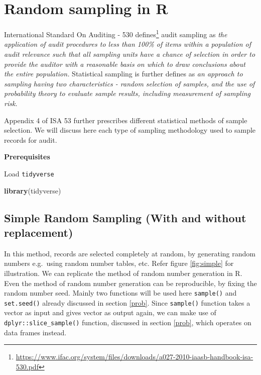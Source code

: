 \documentclass[
]{book}
\newenvironment{Shaded}{\begin{snugshade}}{\end{snugshade}}
\newcommand{\FunctionTok}[1]{\textcolor[rgb]{0.13,0.29,0.53}{\textbf{#1}}}
\newcommand{\NormalTok}[1]{#1}
\begin{document}
\hypertarget{random-sampling-in-r}{%
\chapter{Random sampling in R}\label{random-sampling-in-r}}

International Standard On Auditing - 530 defines\footnote{\url{https://www.ifac.org/system/files/downloads/a027-2010-iaasb-handbook-isa-530.pdf}} audit sampling as \emph{the application of audit procedures to less than 100\% of items within a population of audit relevance such that all sampling units have a chance of selection in order to provide the auditor with a reasonable basis on which to draw conclusions about the entire population.} Statistical sampling is further defines as \emph{an approach to sampling having two characteristics - random selection of samples, and the use of probability theory to evaluate sample results, including measurement of sampling risk.}

Appendix 4 of ISA 53 further prescribes different statistical methods of sample selection. We will discuss here each type of sampling methodology used to sample records for audit.

\textbf{Prerequisites}

Load \texttt{tidyverse}

\begin{Shaded}
\begin{Highlighting}[]
\FunctionTok{library}\NormalTok{(tidyverse)}
\end{Highlighting}
\end{Shaded}

\hypertarget{simple-random-sampling-with-and-without-replacement}{%
\section{Simple Random Sampling (With and without replacement)}\label{simple-random-sampling-with-and-without-replacement}}

In this method, records are selected completely at random, by generating random numbers e.g.~using random number tables, etc. Refer figure \ref{fig:simple} for illustration. We can replicate the method of random number generation in R. Even the method of random number generation can be reproducible, by fixing the random number seed. Mainly two functions will be used here \texttt{sample()} and \texttt{set.seed()} already discussed in section \ref{prob}. Since \texttt{sample()} function takes a vector as input and gives vector as output again, we can make use of \texttt{dplyr::slice\_sample()} function, discussed in section \ref{prob}, which operates on data frames instead.
\end{document}
